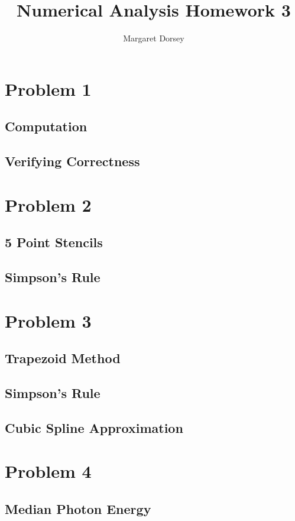 \documentclass[11pt]{article} %
\title{Numerical Analysis Homework 3}
\author{Margaret Dorsey}
\begin{document}
\maketitle

\section*{Problem 1}
\subsection*{Computation}

\subsection*{Verifying Correctness}

\section*{Problem 2}
\subsection*{5 Point Stencils}

\subsection*{Simpson's Rule}

\section*{Problem 3}
\subsection*{Trapezoid Method}

\subsection*{Simpson's Rule}

\subsection*{Cubic Spline Approximation}
\section*{Problem 4}

\subsection*{Median Photon Energy}
\end{document}
